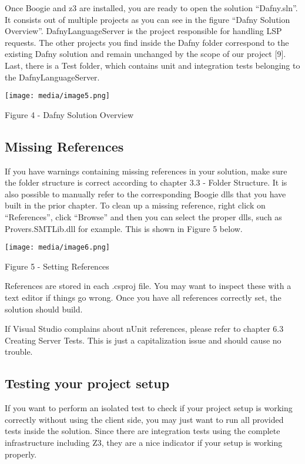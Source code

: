 \documentclass[]{book}
\begin{document}
Once Boogie and z3 are installed, you are ready to open the solution ``Dafny.sln''. It consists out of multiple projects as you can see in the figure ``Dafny Solution Overview''. DafnyLanguageServer is the project responsible for handling LSP requests. The other projects you find inside the Dafny folder correspond to the existing Dafny solution and remain unchanged by the scope of our project {[}9{]}. Last, there is a Test folder, which contains unit and integration tests belonging to the DafnyLanguageServer.

\texttt{[image: media/image5.png]}

Figure 4 - Dafny Solution Overview

\subsection{Missing References}\label{missing-references}

If you have warnings containing missing references in your solution, make sure the folder structure is correct according to chapter 3.3 - Folder Structure. It is also possible to manually refer to the corresponding Boogie dlls that you have built in the prior chapter. To clean up a missing reference, right click on ``References'', click ``Browse'' and then you can select the proper dlls, such as Provers.SMTLib.dll for example. This is shown in Figure 5 below.

\texttt{[image: media/image6.png]}

\protect\hypertarget{_Ref26821980}{}{}Figure 5 - Setting References

References are stored in each .csproj file. You may want to inspect these with a text editor if things go wrong. Once you have all references correctly set, the solution should build.

If Visual Studio complains about nUnit references, please refer to chapter 6.3 Creating Server Tests. This is just a capitalization issue and should cause no trouble.

\subsection{Testing your project setup}\label{testing-your-project-setup}

If you want to perform an isolated test to check if your project setup is working correctly without using the client side, you may just want to run all provided tests inside the solution. Since there are integration tests using the complete infrastructure including Z3, they are a nice indicator if your setup is working properly.
\end{document}
